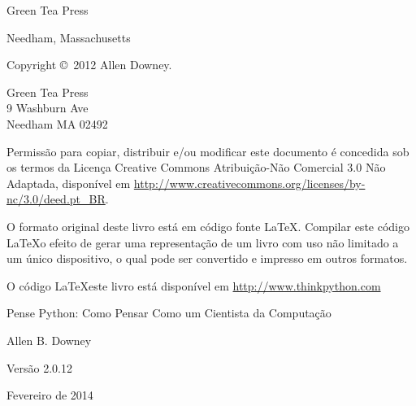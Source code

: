 \documentclass[10pt]{book}
\newcommand{\thetitle}{Pense Python: Como Pensar Como um Cientista da Computação}
\newcommand{\theversion}{2.0.12}
\newcommand{\thedate}{Fevereiro de 2014}
\begin{document}
\begin{latexonly}
\begin{flushright}
{\Large Green Tea Press}

{\small Needham, Massachusetts}

\vfill

\end{flushright}


\pagebreak
\thispagestyle{empty}

{\small
Copyright \copyright ~2012 Allen Downey.


\vspace{0.2in}

\begin{flushleft}
Green Tea Press       \\
9 Washburn Ave        \\
Needham MA 02492
\end{flushleft}

Permissão para copiar, distribuir e/ou modificar este documento é concedida
sob os termos da Licença Creative Commons Atribuição-Não Comercial 3.0 Não Adaptada,
 disponível em \url{http://www.creativecommons.org/licenses/by-nc/3.0/deed.pt_BR}.

O formato original deste livro está em código fonte \LaTeX. Compilar este
código \LaTeX{} o efeito de gerar uma representação de um livro
com uso não limitado a um único dispositivo, o qual pode ser convertido e impresso
em outros formatos.

O código \LaTeX\para este livro está disponível em
\url{http://www.thinkpython.com}

\vspace{0.2in}

} %

\end{latexonly}



\begin{htmlonly}


{\Large \thetitle}

{\large Allen B. Downey}

Versão \theversion

\thedate

\setcounter{chapter}{-1}

\end{htmlonly}

\fi
\end{document}
